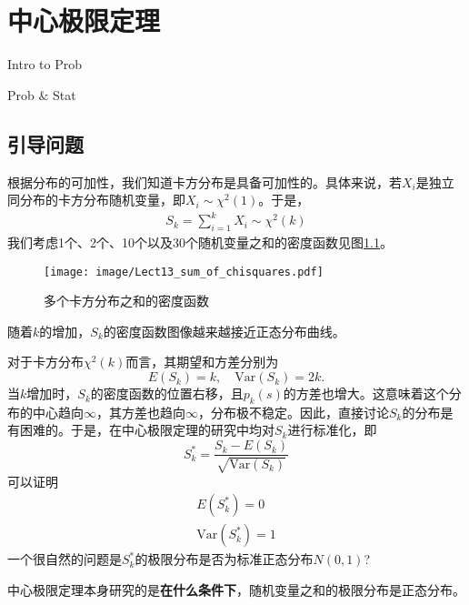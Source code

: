 \chapter{中心极限定理}
\begin{introduction}
  \item Intro to Prob 
  \item Prob $\&$ Stat
\end{introduction}
\section{引导问题}
根据分布的可加性，我们知道卡方分布是具备可加性的。具体来说，若$X_i$是独立同分布的卡方分布随机变量，即$X_i \sim \chi^2(1)$。于是，
\begin{eqnarray*}
    S_{k} = \sum_{i=1}^{k}X_i \sim \chi^2(k)
\end{eqnarray*}
我们考虑1个、2个、10个以及30个随机变量之和的密度函数见图\ref{fig:lect13_sum_of_chisquared_rv}。
\begin{figure}[ht]
    \centering
    \texttt{[image: image/Lect13\_sum\_of\_chisquares.pdf]}
    \caption{多个卡方分布之和的密度函数}
    \label{fig:lect13_sum_of_chisquared_rv}
\end{figure}

\begin{remark}
随着$k$的增加，$S_k$的密度函数图像越来越接近正态分布曲线。
\end{remark}

对于卡方分布$\chi^2(k)$而言，其期望和方差分别为$$
E(S_k)=k, \quad \text{Var}(S_k) = 2k.$$
当$k$增加时，$S_k$的密度函数的位置右移，且$p_{k}(s)$的方差也增大。这意味着这个分布的中心趋向$\infty$，其方差也趋向$\infty$，分布极不稳定。因此，直接讨论$S_k$的分布是有困难的。于是，在中心极限定理的研究中均对$S_k$进行标准化，即
$$
S_k^\ast = \frac{S_k - E(S_k)}{\sqrt{\text{Var}(S_k)}}
$$
可以证明
\begin{eqnarray*}
    E(S_k^\ast) = 0\\
    \text{Var}(S_k^\ast) = 1
\end{eqnarray*}
一个很自然的问题是$S_k^{\ast}$的极限分布是否为标准正态分布$N(0,1)$?
\begin{problem}
   中心极限定理本身研究的是\textbf{在什么条件下}，随机变量之和的极限分布是正态分布。
\end{problem}

